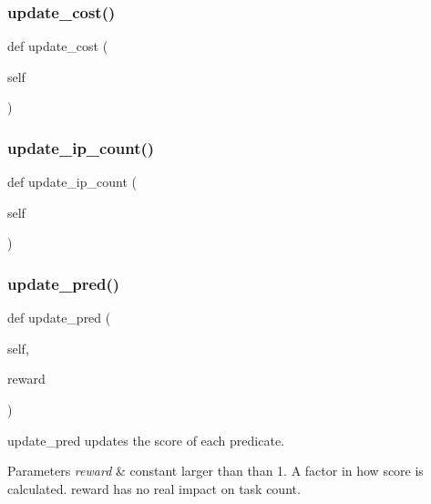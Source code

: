 \subsubsection{\texorpdfstring{update\_cost()}{update\_cost()}}
{\footnotesize\ttfamily def update\+\_\+cost (\begin{DoxyParamCaption}\item[{}]{self }\end{DoxyParamCaption})}

\mbox{\label{classdynamicfilterapp_1_1models_1_1_predicate_af28772c782daf9e16362c89252e4c75c}} 
\subsubsection{\texorpdfstring{update\_ip\_count()}{update\_ip\_count()}}
{\footnotesize\ttfamily def update\+\_\+ip\+\_\+count (\begin{DoxyParamCaption}\item[{}]{self }\end{DoxyParamCaption})}

\mbox{\label{classdynamicfilterapp_1_1models_1_1_predicate_a10d89924e071640aee4eedd86662e505}} 
\subsubsection{\texorpdfstring{update\_pred()}{update\_pred()}}
{\footnotesize\ttfamily def update\+\_\+pred (\begin{DoxyParamCaption}\item[{}]{self,  }\item[{}]{reward }\end{DoxyParamCaption})}



update\+\_\+pred updates the score of each predicate. 


\begin{DoxyParams}{Parameters}
{\em reward} & constant larger than than 1. A factor in how score is calculated. reward has no real impact on task count. \\
\hline
\end{DoxyParams}
\mbox{\label{classdynamicfilterapp_1_1models_1_1_predicate_a8945ec4943839cc7dc37954ae33e2397}} 
